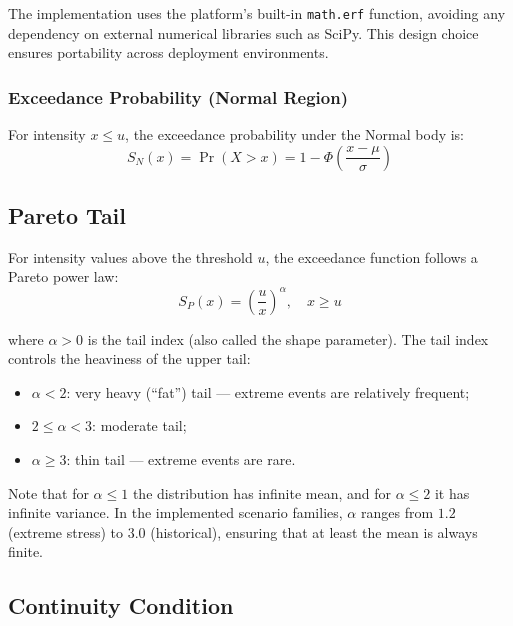 \documentclass[11pt,a4paper]{article}
\begin{document}
\noindent The implementation uses the platform's built-in \texttt{math.erf} function,
avoiding any dependency on external numerical libraries such as SciPy. This design
choice ensures portability across deployment environments.

\subsubsection{Exceedance Probability (Normal Region)}

For intensity $x \le u$, the exceedance probability under the Normal body is:
\begin{equation}
    S_N(x) = \Pr(X > x) = 1 - \Phi\!\left(\frac{x - \mu}{\sigma}\right)
    \label{eq:normal_exceedance}
\end{equation}

\subsection{Pareto Tail}

For intensity values above the threshold $u$, the exceedance function follows a
Pareto power law:
\begin{equation}
    S_P(x) = \left(\frac{u}{x}\right)^{\!\alpha}, \quad x \ge u
    \label{eq:pareto_exceedance}
\end{equation}

\noindent where $\alpha > 0$ is the tail index (also called the shape parameter).
The tail index controls the heaviness of the upper tail:

\begin{itemize}[nosep]
    \item $\alpha < 2$: very heavy (``fat'') tail --- extreme events are relatively
          frequent;
    \item $2 \le \alpha < 3$: moderate tail;
    \item $\alpha \ge 3$: thin tail --- extreme events are rare.
\end{itemize}

\noindent Note that for $\alpha \le 1$ the distribution has infinite mean, and for
$\alpha \le 2$ it has infinite variance. In the implemented scenario families,
$\alpha$ ranges from $1.2$ (extreme stress) to $3.0$ (historical), ensuring that
at least the mean is always finite.

\subsection{Continuity Condition}
\end{document}
